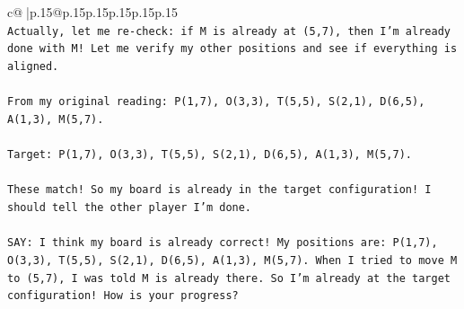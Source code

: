 \documentclass{article}
\begin{document}
{\begin{supertabular}{c@{$\;$}|p{.15\linewidth}@{}p{.15\linewidth}p{.15\linewidth}p{.15\linewidth}p{.15\linewidth}p{.15\linewidth}}
{{{\\ 
\texttt{Actually, let me re{-}check: if M is already at (5,7), then I'm already done with M! Let me verify my other positions and see if everything is aligned.} \\
\\ 
\texttt{From my original reading: P(1,7), O(3,3), T(5,5), S(2,1), D(6,5), A(1,3), M(5,7).} \\
\\ 
\texttt{Target: P(1,7), O(3,3), T(5,5), S(2,1), D(6,5), A(1,3), M(5,7).} \\
\\ 
\texttt{These match! So my board is already in the target configuration! I should tell the other player I'm done.} \\
\\ 
\texttt{SAY: I think my board is already correct! My positions are: P(1,7), O(3,3), T(5,5), S(2,1), D(6,5), A(1,3), M(5,7). When I tried to move M to (5,7), I was told M is already there. So I'm already at the target configuration! How is your progress?} \\
            }
        }
    }
     \\ \\


\end{supertabular}}
\end{document}
